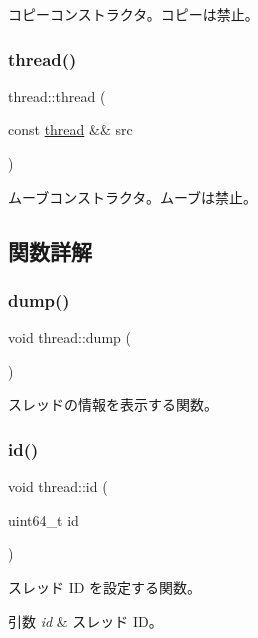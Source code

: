 コピーコンストラクタ。コピーは禁止。 \hypertarget{classthread_af2d2b9d1eb276e3d8911694c84cb5f33}{}\label{classthread_af2d2b9d1eb276e3d8911694c84cb5f33} 
\subsubsection{\texorpdfstring{thread()}{thread()}\hspace{0.1cm}{\footnotesize\ttfamily [4/4]}}
{\footnotesize\ttfamily thread\+::thread (\begin{DoxyParamCaption}\item[{const \hyperlink{classthread}{thread} \&\&}]{src }\end{DoxyParamCaption})\hspace{0.3cm}{\ttfamily [delete]}}

ムーブコンストラクタ。ムーブは禁止。 

\subsection{関数詳解}
\hypertarget{classthread_a4b78d34fbeff62ace13a4e9a6d4515f4}{}\label{classthread_a4b78d34fbeff62ace13a4e9a6d4515f4} 
\subsubsection{\texorpdfstring{dump()}{dump()}}
{\footnotesize\ttfamily void thread\+::dump (\begin{DoxyParamCaption}{ }\end{DoxyParamCaption})}

スレッドの情報を表示する関数。 \hypertarget{classthread_a72727217c70fb64523bf4d367eae1761}{}\label{classthread_a72727217c70fb64523bf4d367eae1761} 
\subsubsection{\texorpdfstring{id()}{id()}\hspace{0.1cm}{\footnotesize\ttfamily [1/2]}}
{\footnotesize\ttfamily void thread\+::id (\begin{DoxyParamCaption}\item[{uint64\+\_\+t}]{id }\end{DoxyParamCaption})}

スレッド ID を設定する関数。 
\begin{DoxyParams}{引数}
{\em id} & スレッド I\+D。 \\
\hline
\end{DoxyParams}
\hypertarget{classthread_a490d6ffc5beccdf584f49fa85cc12d9d}{}\label{classthread_a490d6ffc5beccdf584f49fa85cc12d9d} 
